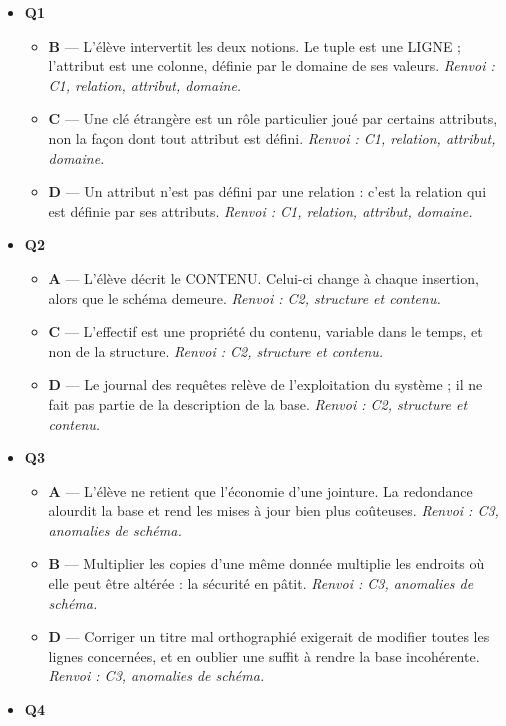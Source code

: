 \begin{itemize}
  \item \textbf{Q1}
  \begin{itemize}
    \item \textbf{B} — L'élève intervertit les deux notions. Le tuple est une LIGNE ; l'attribut est une colonne, définie par le domaine de ses valeurs. \emph{Renvoi : C1, relation, attribut, domaine.}
    \item \textbf{C} — Une clé étrangère est un rôle particulier joué par certains attributs, non la façon dont tout attribut est défini. \emph{Renvoi : C1, relation, attribut, domaine.}
    \item \textbf{D} — Un attribut n'est pas défini par une relation : c'est la relation qui est définie par ses attributs. \emph{Renvoi : C1, relation, attribut, domaine.}
  \end{itemize}
  \item \textbf{Q2}
  \begin{itemize}
    \item \textbf{A} — L'élève décrit le CONTENU. Celui-ci change à chaque insertion, alors que le schéma demeure. \emph{Renvoi : C2, structure et contenu.}
    \item \textbf{C} — L'effectif est une propriété du contenu, variable dans le temps, et non de la structure. \emph{Renvoi : C2, structure et contenu.}
    \item \textbf{D} — Le journal des requêtes relève de l'exploitation du système ; il ne fait pas partie de la description de la base. \emph{Renvoi : C2, structure et contenu.}
  \end{itemize}
  \item \textbf{Q3}
  \begin{itemize}
    \item \textbf{A} — L'élève ne retient que l'économie d'une jointure. La redondance alourdit la base et rend les mises à jour bien plus coûteuses. \emph{Renvoi : C3, anomalies de schéma.}
    \item \textbf{B} — Multiplier les copies d'une même donnée multiplie les endroits où elle peut être altérée : la sécurité en pâtit. \emph{Renvoi : C3, anomalies de schéma.}
    \item \textbf{D} — Corriger un titre mal orthographié exigerait de modifier toutes les lignes concernées, et en oublier une suffit à rendre la base incohérente. \emph{Renvoi : C3, anomalies de schéma.}
  \end{itemize}
  \item \textbf{Q4}

\end{itemize}
